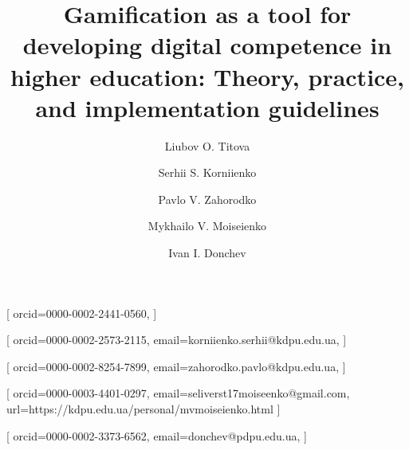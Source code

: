 \documentclass[cte]{acnsart}
\begin{document}
\title{Gamification as a tool for developing digital competence in higher education: Theory, practice, and implementation guidelines}

\author[1]{Liubov O. Titova}[%
orcid=0000-0002-2441-0560,
]

\address[1]{Pavlo Tychyna Uman State Pedagogical University, 2 Sadova Str., Uman, 20300, Ukraine}

\author[2]{Serhii S. Korniienko}[%
orcid={0000-0002-2573-2115},
email={korniienko.serhii@kdpu.edu.ua},
]

\author[2]{Pavlo V. Zahorodko}[%
orcid={0000-0002-8254-7899},
email={zahorodko.pavlo@kdpu.edu.ua},
]


	\author[2]{Mykhailo V. Moiseienko}[%
orcid={0000-0003-4401-0297},
email={seliverst17moiseenko@gmail.com},
url={https://kdpu.edu.ua/personal/mvmoiseienko.html}
]

\address[2]{Kryvyi Rih State Pedagogical University,
	54 Universytetskyi Ave., Kryvyi Rih, 50086, Ukraine}



\author[3]{Ivan I. Donchev}[
orcid={0000-0002-3373-6562}, 
email={donchev@pdpu.edu.ua},
]

\address[3]{South Ukrainian National Pedagogical University named after K. D. Ushynsky, 26 Staroportofrankivska Str., Odesa,
	65020, Ukraine}



\end{document}
